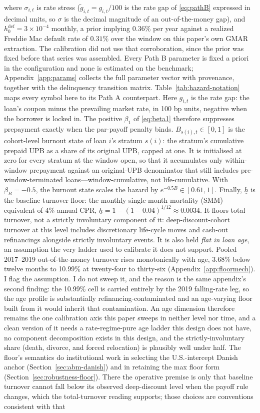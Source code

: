 \documentclass[12pt]{article}
\begin{document}
where $\sigma_{i,t}$ is rate stress ($\tilde g_{i,t} = g_{i,t}/100$ is the rate gap of \eqref{eq:pathB} expressed in decimal units, so $\sigma$ is the decimal magnitude of an out-of-the-money gap), and $h^{\mathrm{def}}_0 = 3\times10^{-4}$ monthly, a prior implying $0.36\%$ per year against a realized Freddie Mac default rate of $0.31\%$ over the window on this paper's own GMAR extraction. The calibration did not use that corroboration, since the prior was fixed before that series was assembled. Every Path B parameter is fixed a priori in the configuration and none is estimated on the benchmark; Appendix~\ref{app:params} collects the full parameter vector with provenance, together with the delinquency transition matrix. Table~\ref{tab:hazard-notation} maps every symbol here to its Path A counterpart. Here $g_{i,t}$ is the rate gap: the loan's coupon minus the prevailing market rate, in 100 bp units, negative when the borrower is locked in. The positive $\beta_1$ of \eqref{eq:beta1} therefore suppresses prepayment exactly when the par-payoff penalty binds. $B_{s(i),t} \in [0,1]$ is the cohort-level burnout state of loan $i$'s stratum $s(i)$: the stratum's cumulative prepaid UPB as a share of its original UPB, capped at one. It is initialised at zero for every stratum at the window open, so that it accumulates only within-window prepayment against an original-UPB denominator that still includes pre-window-terminated loans---window-cumulative, not life-cumulative. With $\beta_B = -0.5$, the burnout state scales the hazard by $e^{-0.5 B} \in [0.61, 1]$. Finally, $\underline{h}$ is the baseline turnover floor: the monthly single-month-mortality (SMM) equivalent of 4\% annual CPR, $\underline{h} = 1-(1-0.04)^{1/12} \approx 0.0034$. It floors total turnover, not a strictly involuntary component of it: deep-discount-cohort turnover at this level includes discretionary life-cycle moves and cash-out refinancings alongside strictly involuntary events. It is also held \emph{flat in loan age}, an assumption the very ladder used to calibrate it does not support. Pooled 2017--2019 out-of-the-money turnover rises monotonically with age, 3.68\% below twelve months to 10.99\% at twenty-four to thirty-six (Appendix~\ref{app:floormech}). I flag the assumption. I do not sweep it, and the reason is the same appendix's second finding: the 10.99\% cell is carried entirely by the 2019 falling-rate leg, so the age profile is substantially refinancing-contaminated and an age-varying floor built from it would inherit that contamination. An age dimension therefore remains the one calibration axis this paper sweeps in neither level nor time, and a clean version of it needs a rate-regime-pure age ladder this design does not have, no component decomposition exists in this design, and the strictly-involuntary share (death, divorce, and forced relocation) is plausibly well under half. The floor's semantics do institutional work in selecting the U.S.-intercept Danish anchor (Section~\ref{sec:abm-danish}) and in retaining the max floor form (Section~\ref{sec:robustness-floor}). There the operative premise is only that baseline turnover cannot fall below its observed deep-discount level when the payoff rule changes, which the total-turnover reading supports; those choices are conventions consistent with that 
\end{document}
